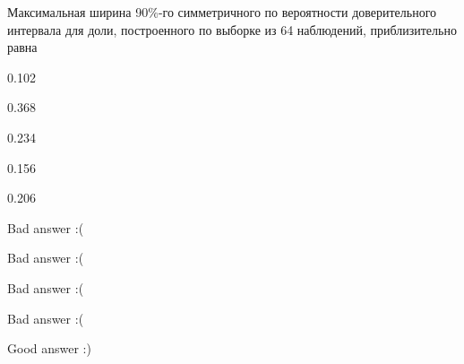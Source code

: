 
\begin{question}
Максимальная ширина 90\%-го симметричного по вероятности доверительного
интервала для доли, построенного по выборке из 64 наблюдений,
приблизительно равна
\begin{answerlist}
  \item 0.102
  \item 0.368
  \item 0.234
  \item 0.156
  \item 0.206
\end{answerlist}
\end{question}

\begin{solution}
\begin{answerlist}
  \item Bad answer :(
  \item Bad answer :(
  \item Bad answer :(
  \item Bad answer :(
  \item Good answer :)
\end{answerlist}
\end{solution}

